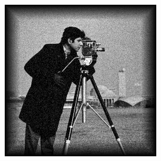 \begin{frame}
\begin{figure}[!ht]
\begin{subfigure}{.3\linewidth}
      \vspace{-2mm}
      \includegraphics[width=\linewidth]
        {pictures/recap/denoiseExample/snr20.png}
    \end{subfigure}
  

\end{figure}
\end{frame}
